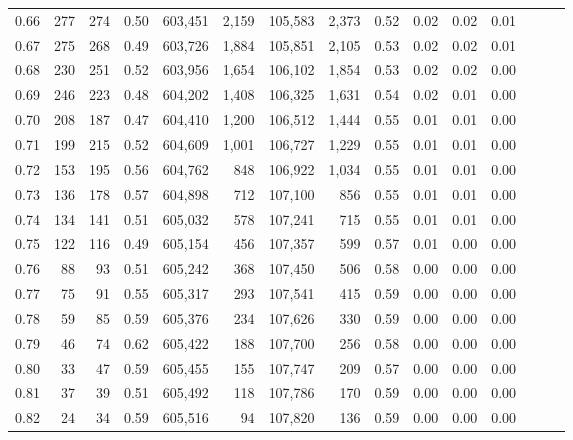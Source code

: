 \begin{tabular}{rrrrrrrrrrrrrrr}
0.66 &     277 &    274 &  0.50 &  603,451 &    2,159 &  105,583 &    2,373 &  0.52 &  0.02 &  0.02 &      0.01 \\
0.67 &     275 &    268 &  0.49 &  603,726 &    1,884 &  105,851 &    2,105 &  0.53 &  0.02 &  0.02 &      0.01 \\
0.68 &     230 &    251 &  0.52 &  603,956 &    1,654 &  106,102 &    1,854 &  0.53 &  0.02 &  0.02 &      0.00 \\
0.69 &     246 &    223 &  0.48 &  604,202 &    1,408 &  106,325 &    1,631 &  0.54 &  0.02 &  0.01 &      0.00 \\
0.70 &     208 &    187 &  0.47 &  604,410 &    1,200 &  106,512 &    1,444 &  0.55 &  0.01 &  0.01 &      0.00 \\
0.71 &     199 &    215 &  0.52 &  604,609 &    1,001 &  106,727 &    1,229 &  0.55 &  0.01 &  0.01 &      0.00 \\
0.72 &     153 &    195 &  0.56 &  604,762 &      848 &  106,922 &    1,034 &  0.55 &  0.01 &  0.01 &      0.00 \\
0.73 &     136 &    178 &  0.57 &  604,898 &      712 &  107,100 &      856 &  0.55 &  0.01 &  0.01 &      0.00 \\
0.74 &     134 &    141 &  0.51 &  605,032 &      578 &  107,241 &      715 &  0.55 &  0.01 &  0.01 &      0.00 \\
0.75 &     122 &    116 &  0.49 &  605,154 &      456 &  107,357 &      599 &  0.57 &  0.01 &  0.00 &      0.00 \\
0.76 &      88 &     93 &  0.51 &  605,242 &      368 &  107,450 &      506 &  0.58 &  0.00 &  0.00 &      0.00 \\
0.77 &      75 &     91 &  0.55 &  605,317 &      293 &  107,541 &      415 &  0.59 &  0.00 &  0.00 &      0.00 \\
0.78 &      59 &     85 &  0.59 &  605,376 &      234 &  107,626 &      330 &  0.59 &  0.00 &  0.00 &      0.00 \\
0.79 &      46 &     74 &  0.62 &  605,422 &      188 &  107,700 &      256 &  0.58 &  0.00 &  0.00 &      0.00 \\
0.80 &      33 &     47 &  0.59 &  605,455 &      155 &  107,747 &      209 &  0.57 &  0.00 &  0.00 &      0.00 \\
0.81 &      37 &     39 &  0.51 &  605,492 &      118 &  107,786 &      170 &  0.59 &  0.00 &  0.00 &      0.00 \\
0.82 &      24 &     34 &  0.59 &  605,516 &       94 &  107,820 &      136 &  0.59 &  0.00 &  0.00 &      0.00 \\

\end{tabular}
